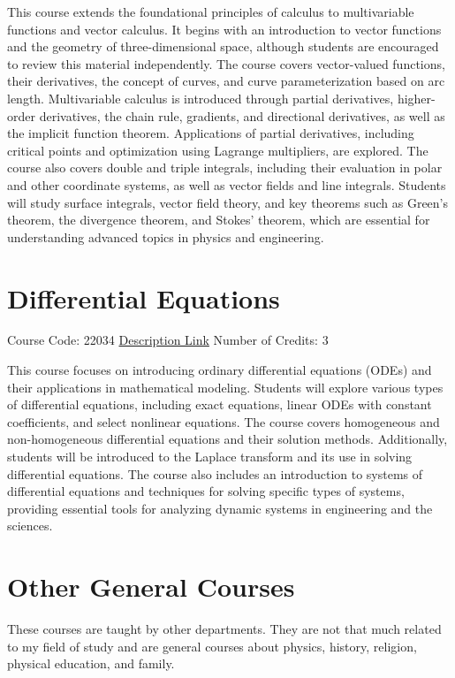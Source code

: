 \documentclass[
fontsize=11pt,
paper=a4,
parskip=half,
enlargefirstpage=off,    %
fromalign=right,        %
fromphone=on,           %
fromemail=on,
fromrule=off,           %
addrfield=off,          %
backaddress=on,         %
subject=beforeopening,  %
locfield=narrow,        %
foldmarks=off,          %
open=any
]{scrartcl}
\begin{document}
This course extends the foundational principles of calculus to multivariable functions and vector calculus. It begins with an introduction to vector functions and the geometry of three-dimensional space, although students are encouraged to review this material independently. The course covers vector-valued functions, their derivatives, the concept of curves, and curve parameterization based on arc length. Multivariable calculus is introduced through partial derivatives, higher-order derivatives, the chain rule, gradients, and directional derivatives, as well as the implicit function theorem. Applications of partial derivatives, including critical points and optimization using Lagrange multipliers, are explored. The course also covers double and triple integrals, including their evaluation in polar and other coordinate systems, as well as vector fields and line integrals. Students will study surface integrals, vector field theory, and key theorems such as Green’s theorem, the divergence theorem, and Stokes' theorem, which are essential for understanding advanced topics in physics and engineering.


\section{Differential Equations}
Course Code: 22034 \qquad \quad \href{https://docs.ce.sharif.edu/course/22034}{Description Link}
\qquad \quad Number of Credits: 3

This course focuses on introducing ordinary differential equations (ODEs) and their applications in mathematical modeling. Students will explore various types of differential equations, including exact equations, linear ODEs with constant coefficients, and select nonlinear equations. The course covers homogeneous and non-homogeneous differential equations and their solution methods. Additionally, students will be introduced to the Laplace transform and its use in solving differential equations. The course also includes an introduction to systems of differential equations and techniques for solving specific types of systems, providing essential tools for analyzing dynamic systems in engineering and the sciences.

\section{Other General Courses}
These courses are taught by other departments. They are not that much related to my field of study and are general courses about physics, history, religion, physical education, and family.
\end{document}
